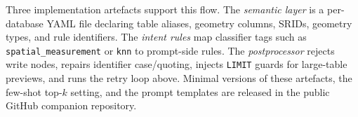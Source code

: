 \documentclass[11pt]{article}
\begin{document}
Three implementation artefacts support this flow. The \emph{semantic layer} is a per-database YAML file declaring table aliases, geometry columns, SRIDs, geometry types, and rule identifiers. The \emph{intent rules} map classifier tags such as \texttt{spatial\_measurement} or \texttt{knn} to prompt-side rules. The \emph{postprocessor} rejects write nodes, repairs identifier case/quoting, injects \texttt{LIMIT} guards for large-table previews, and runs the retry loop above. Minimal versions of these artefacts, the few-shot top-$k$ setting, and the prompt templates are released in the public GitHub companion repository.
\end{document}

